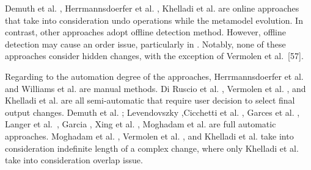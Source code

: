  	  
 
 				

 	
 	



Demuth et al. \cite{demuth2015constraint}, Herrmannsdoerfer et al. \cite{herrmannsdoerfer2009cope}, Khelladi et al. \cite{khelladi2016detecting} are online approaches that take into consideration undo operations while the metamodel evolution.
In contrast, other approaches \cite{williams2012searching,10.1145/2000410.2000416,levendovszky2014semi,garces2009managing,cicchetti_managing_2009,langer_posteriori_2013,garcia2012model,xing2006refactoring,moghadam2012automated,vermolen_reconstructing_2012} adopt offline detection method. However,  offline detection may cause an order issue, particularly in \cite{williams2012searching,10.1145/2000410.2000416,levendovszky2014semi,garces2009managing,langer_posteriori_2013,garcia2012model,xing2006refactoring,moghadam2012automated}. Notably, none of these approaches consider hidden changes, with the exception of Vermolen et al.~[57].


Regarding to the automation degree of the approaches, Herrmannsdoerfer et al. \cite{herrmannsdoerfer2009cope} and
Williams et al. \cite{williams2012searching} are manual methods. Di Ruscio et al. \cite{10.1145/2000410.2000416}, Vermolen et al. \cite{vermolen_reconstructing_2012}, and Khelladi et al. \cite{khelladi2016detecting} are all semi-automatic that require user decision to select final output changes.
Demuth et al. \cite{demuth2015constraint}; Levendovszky \cite{levendovszky2014semi},Cicchetti et al. \cite{cicchetti_managing_2009}, Garces et al. \cite{garces2009managing}, Langer et al.~\cite{langer_posteriori_2013}, Garcia \cite{garcia2012model}, Xing  et al. \cite{xing2006refactoring}, Moghadam et al. \cite{moghadam2012automated} are full automatic approaches. Moghadam et al. \cite{moghadam2012automated}, Vermolen et al. \cite{vermolen_reconstructing_2012}, and Khelladi et al. \cite{khelladi2016detecting} take into consideration indefinite length of a complex change, where only 
Khelladi et al. \cite{khelladi2016detecting} take into consideration overlap issue.


